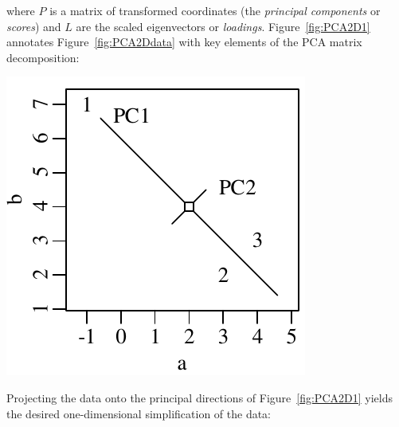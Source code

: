 \noindent where $P$ is a matrix of transformed coordinates (the
\emph{principal components} or \emph{scores}) and $L$ are the scaled
eigenvectors or \emph{loadings}. Figure~\ref{fig:PCA2D1} annotates
Figure~\ref{fig:PCA2Ddata} with key elements of the PCA matrix
decomposition:

\noindent\begin{minipage}[t][][b]{.25\textwidth}
  \includegraphics[width=\textwidth]{../figures/PCA2D1.pdf}\medskip
\end{minipage}
\begin{minipage}[t][][t]{.75\textwidth}
  \label{fig:PCA2D1}
\end{minipage}

Projecting the data onto the principal directions of
Figure~\ref{fig:PCA2D1} yields the desired one-dimensional
simplification of the data:

